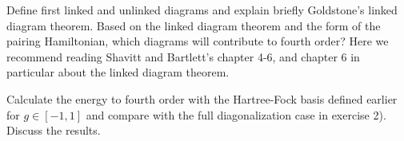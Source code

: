 \documentclass[prc]{revtex4} \usepackage[dvips]{graphicx}
\begin{document}
\begin{enumerate}
Define first linked and unlinked diagrams and explain briefly Goldstone's linked diagram theorem.
Based on the linked diagram theorem and the form of the pairing Hamiltonian, which diagrams will contribute
to fourth order?  Here we recommend reading Shavitt and Bartlett's chapter 4-6, and chapter 6 in particular about the linked diagram theorem.

Calculate the energy to fourth order with the Hartree-Fock basis defined earlier for $g\in [-1,1]$ and compare
with the full diagonalization case in exercise 2). Discuss the results.
\end{enumerate}



 
\end{document}
